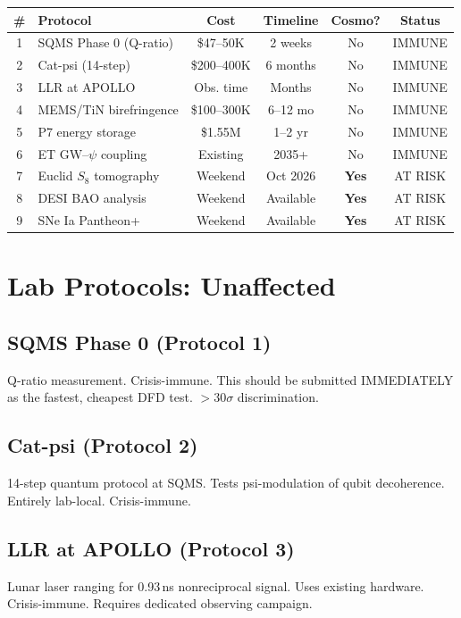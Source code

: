 \documentclass[11pt]{article}
\begin{document}
\begin{table}[h]
\centering
\small
\begin{tabular}{clcccc}
\toprule
\textbf{\#} & \textbf{Protocol} & \textbf{Cost} & \textbf{Timeline} & \textbf{Cosmo?} & \textbf{Status} \\
\midrule
1 & SQMS Phase 0 (Q-ratio) & \$47--50K & 2 weeks & No & IMMUNE \\
2 & Cat-psi (14-step) & \$200--400K & 6 months & No & IMMUNE \\
3 & LLR at APOLLO & Obs. time & Months & No & IMMUNE \\
4 & MEMS/TiN birefringence & \$100--300K & 6--12 mo & No & IMMUNE \\
5 & P7 energy storage & \$1.55M & 1--2 yr & No & IMMUNE \\
6 & ET GW--$\psi$ coupling & Existing & 2035+ & No & IMMUNE \\
\midrule
7 & Euclid $S_8$ tomography & Weekend & Oct 2026 & \textbf{Yes} & AT RISK \\
8 & DESI BAO analysis & Weekend & Available & \textbf{Yes} & AT RISK \\
9 & SNe Ia Pantheon+ & Weekend & Available & \textbf{Yes} & AT RISK \\
\bottomrule
\end{tabular}
\end{table}

\section{Lab Protocols: Unaffected}

\subsection{SQMS Phase 0 (Protocol 1)}
Q-ratio measurement. Crisis-immune. This should be submitted IMMEDIATELY
as the fastest, cheapest DFD test. $>30\sigma$ discrimination.

\subsection{Cat-psi (Protocol 2)}
14-step quantum protocol at SQMS. Tests psi-modulation of qubit
decoherence. Entirely lab-local. Crisis-immune.

\subsection{LLR at APOLLO (Protocol 3)}
Lunar laser ranging for 0.93\,ns nonreciprocal signal. Uses existing
hardware. Crisis-immune. Requires dedicated observing campaign.
\end{document}
